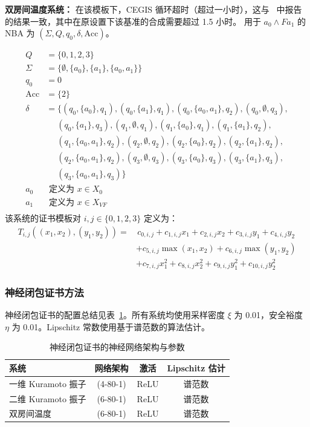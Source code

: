 \textbf{双房间温度系统：}
在该模板下，CEGIS 循环超时（超过一小时），这与~\cite{murali2024closure} 中报告的结果一致，其中在原设置下该基准的合成需要超过 1.5 小时。
用于 $a_0 \land F a_1$ 的 NBA 为 $(\Sigma, Q, q_0, \delta, \text{Acc})$。

\begin{align*}
    Q &= \{0,1,2,3\} \\
    \Sigma &= \{\emptyset, \{a_0\}, \{a_1\}, \{a_0, a_1\}\} \\
    q_0 &= 0 \\
    \text{Acc} &= \{2\} \\
    \delta &= \{(q_0, \{a_0\}, q_1), (q_0, \{a_1\}, q_1), (q_0, \{a_0, a_1\}, q_2), (q_0, \emptyset, q_3), \\
    &\quad\;(q_0, \{a_1\}, q_3), (q_1, \emptyset, q_1), (q_1, \{a_0\}, q_1), (q_1, \{a_1\}, q_2), \\
    &\quad\;(q_1, \{a_0, a_1\}, q_2), (q_2, \emptyset, q_2), (q_2, \{a_0\}, q_2), (q_2, \{a_1\}, q_2), \\
    &\quad\;(q_2, \{a_0, a_1\}, q_2), (q_3, \emptyset, q_3), (q_3,\{a_0\},q_3), (q_3, \{a_1\}, q_3), \\
    &\quad\;(q_3, \{a_0, a_1\}, q_3)\} \\
	a_0 &\text{ 定义为 } x \in X_{0} \\
	a_1 &\text{ 定义为 } x \in X_{VF} \\
\end{align*}
该系统的证书模板对 $i, j \in \{0, 1, 2, 3\}$ 定义为：
\begin{align*}
T_{i,j}((x_1, x_2), (y_1, y_2)) = &\, c_{0, i, j} + c_{1, i, j}x_1 + c_{2, i, j}x_2 + c_{3, i, j}y_1 + c_{4, i, j}y_2 \\
                                  &+ c_{5, i, j}\max(x_1, x_2) + c_{6, i, j}\max(y_1, y_2) \\
                                  &+ c_{7, i, j}x_1^2 + c_{8, i, j}x_2^2 + c_{9, i, j}y_1^2 + c_{10, i, j}y_2^2
\end{align*}

\subsubsection{神经闭包证书方法}
神经闭包证书的配置总结见表~\ref{tab:ncc_config}。所有系统均使用采样密度 $\xi$ 为 0.01，安全裕度 $\eta$ 为 0.01。Lipschitz 常数使用基于谱范数的算法估计。

\begin{table}[h]
\centering
\caption{神经闭包证书的神经网络架构与参数}
\label{tab:ncc_config}
\begin{tabular}{lccc}
\hline
\textbf{系统} & \textbf{网络架构} & \textbf{激活} & \textbf{Lipschitz 估计} \\
\hline
一维 Kuramoto 振子 & (4-80-1) & ReLU & 谱范数 \\
二维 Kuramoto 振子 & (6-80-1) & ReLU & 谱范数 \\
双房间温度 & (6-80-1) & ReLU & 谱范数 \\
\hline
\end{tabular}
\end{table}
